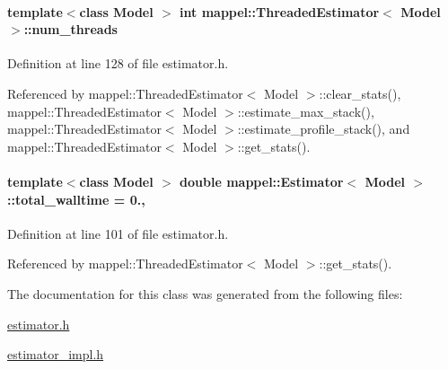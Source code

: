 \paragraph[{\texorpdfstring{num\+\_\+threads}{num_threads}}]{\setlength{\rightskip}{0pt plus 5cm}template$<$class Model $>$ int {\bf mappel\+::\+Threaded\+Estimator}$<$ Model $>$\+::num\+\_\+threads\hspace{0.3cm}{\ttfamily [protected]}}\hypertarget{classmappel_1_1ThreadedEstimator_a6afa05d7d971f3317ce1602de853123b}{}\label{classmappel_1_1ThreadedEstimator_a6afa05d7d971f3317ce1602de853123b}


Definition at line 128 of file estimator.\+h.



Referenced by mappel\+::\+Threaded\+Estimator$<$ Model $>$\+::clear\+\_\+stats(), mappel\+::\+Threaded\+Estimator$<$ Model $>$\+::estimate\+\_\+max\+\_\+stack(), mappel\+::\+Threaded\+Estimator$<$ Model $>$\+::estimate\+\_\+profile\+\_\+stack(), and mappel\+::\+Threaded\+Estimator$<$ Model $>$\+::get\+\_\+stats().

\paragraph[{\texorpdfstring{total\+\_\+walltime}{total_walltime}}]{\setlength{\rightskip}{0pt plus 5cm}template$<$class Model $>$ double {\bf mappel\+::\+Estimator}$<$ Model $>$\+::total\+\_\+walltime = 0.\hspace{0.3cm}{\ttfamily [protected]}, {\ttfamily [inherited]}}\hypertarget{classmappel_1_1Estimator_a5a408458a111c5222193871fa6bb6644}{}\label{classmappel_1_1Estimator_a5a408458a111c5222193871fa6bb6644}


Definition at line 101 of file estimator.\+h.



Referenced by mappel\+::\+Threaded\+Estimator$<$ Model $>$\+::get\+\_\+stats().



The documentation for this class was generated from the following files\+:\begin{DoxyCompactItemize}
\item 
\hyperlink{estimator_8h}{estimator.\+h}\item 
\hyperlink{estimator__impl_8h}{estimator\+\_\+impl.\+h}\end{DoxyCompactItemize}
